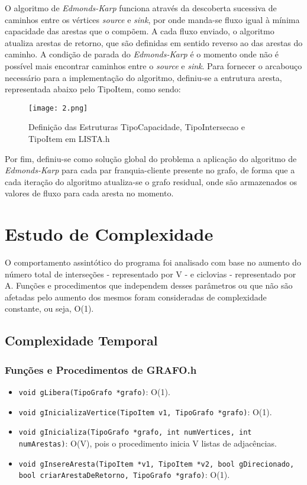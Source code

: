 \documentclass[
    12pt,               %
    a4paper,            %
    oneside,
    english,            %
    french,             %
    spanish,            %
    brazil              %
    ]{abntex2}
\begin{document}
	O algoritmo de \textit{Edmonds-Karp} funciona através da descoberta sucessiva de caminhos entre os vértices \textit{source} e \textit{sink}, por onde manda-se fluxo igual à mínima capacidade das arestas que o compõem. A cada fluxo enviado, o algoritmo atualiza arestas de retorno, que são definidas em sentido reverso ao das arestas do caminho. A condição de parada do \textit{Edmonds-Karp} é o momento onde não é possível mais encontrar caminhos entre o \textit{source} e \textit{sink}. Para fornecer o arcabouço necessário para a implementação do algoritmo, definiu-se a entrutura aresta, representada abaixo pelo TipoItem, como sendo:
	 
\begin{figure}[!htb]
\centering
\texttt{[image: 2.png]}
\caption{Definição das Estruturas TipoCapacidade, TipoIntersecao e TipoItem em LISTA.h}
\end{figure}

	Por fim, definiu-se como solução global do problema a aplicação do algoritmo de \textit{Edmonds-Karp} para cada par franquia-cliente presente no grafo, de forma que a cada iteração do algoritmo atualiza-se o grafo residual, onde são armazenados os valores de fluxo para cada aresta no momento.	

\section*{Estudo de Complexidade}

	O comportamento assintótico do programa foi analisado com base no aumento do número total de interseções - representado por V - e ciclovias - representado por A. Funções e procedimentos que independem desses parâmetros ou que não são afetadas pelo aumento dos mesmos foram consideradas de complexidade constante, ou seja, O(1).
	
\subsection*{Complexidade Temporal}
\subsubsection*{Funções e Procedimentos de GRAFO.h}
\begin{itemize}

	\item \texttt{void gLibera(TipoGrafo *grafo)}:
	O(1).
	\item \texttt{void gInicializaVertice(TipoItem v1, TipoGrafo *grafo)}:
	O(1).
	\item \texttt{void gInicializa(TipoGrafo *grafo, int numVertices, int  numArestas)}:
	O(V), pois o procedimento inicia V listas de adjacências.
	\item \texttt{void gInsereAresta(TipoItem *v1, TipoItem *v2, bool gDirecionado, bool   		  criarArestaDeRetorno, TipoGrafo *grafo)}:
	O(1).
	
\end{itemize}
\end{document}
